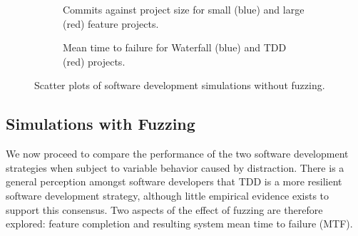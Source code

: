 \documentclass{llncs}
\begin{document}
\begin{figure}
  \centering

  \begin{subfigure}{2.3in}
    \caption{Commits against project size for small (blue) and large (red) feature projects.}
    \label{fig:no-fuzzing:features}

  \end{subfigure}
  \hfill
  \begin{subfigure}{2.3in}
    \caption{Mean time to failure for Waterfall (blue) and TDD (red) projects.}  
    \label{fig:no-fuzzing:mtf}
  \end{subfigure}
  
  \caption{Scatter plots of software development simulations without fuzzing.}
  \label{fig:no-fuzzing}
\end{figure}


\subsection{Simulations with Fuzzing}

We now proceed to compare the performance of the two software development strategies when subject to variable behavior
caused by distraction.  There is a general perception amongst software developers that TDD is a more resilient software
development strategy, although little empirical evidence exists to support this consensus.  Two aspects of the effect of
fuzzing are therefore explored: feature completion and resulting system mean time to failure (MTF).
\end{document}
